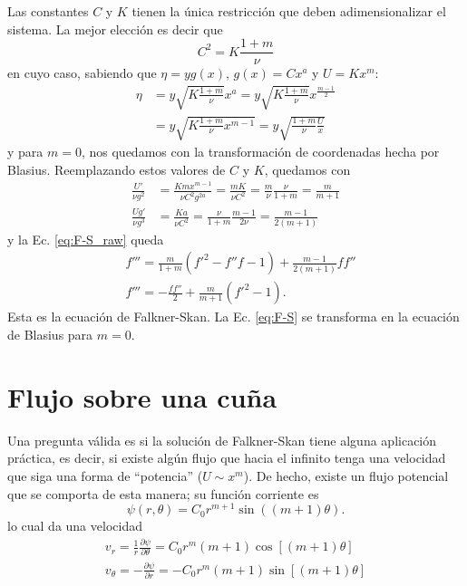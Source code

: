 Las constantes $C$ y $K$ tienen la única restricción que deben adimensionalizar el sistema.
La mejor elección es decir que 
%
\begin{equation}
C^2 = K\frac{1+m}{\nu}
\end{equation}
%
en cuyo caso, sabiendo que $\eta=yg(x)$, $g(x)=Cx^a$ y $U=Kx^m$:
%
\begin{align}\label{eq:eta_F-S}
\eta &= y\sqrt{K\frac{1+m}{\nu}}x^a = y\sqrt{K\frac{1+m}{\nu}}x^{\frac{m-1}{2}} \nonumber\\
&= y\sqrt{K\frac{1+m}{\nu}x^{m-1}} = y\sqrt{\frac{1+m}{\nu}\frac{U}{x}}
\end{align}
%
y para $m=0$, nos quedamos con la transformación de coordenadas hecha por Blasius.
Reemplazando estos valores de $C$ y $K$, quedamos con
%
\begin{align}
\frac{U'}{\nu g^2} &= \frac{Kmx^{m-1}}{\nu C^2g^{2a}} = \frac{mK}{\nu C^2} = \frac{m}{\nu}\frac{\nu}{1+m} = \frac{m}{m+1}\nonumber\\
\frac{Ug'}{\nu g^3} &= \frac{Ka}{\nu C^2} = \frac{\nu}{1+m}\frac{m-1}{2\nu} = \frac{m-1}{2(m+1)}
\end{align}
%
y la Ec. \eqref{eq:F-S_raw} queda
%
\begin{align}\label{eq:F-S}
&f''' = \frac{m}{1+m}(f'^2-f''f-1)+\frac{m-1}{2(m+1)}ff''\nonumber\\
&f''' = -\frac{ff''}{2} + \frac{m}{m+1}(f'^2-1).
\end{align}
%
Esta es la ecuación de Falkner-Skan.
La Ec. \eqref{eq:F-S} se transforma en la ecuación de Blasius para $m=0$. 

\section*{Flujo sobre una cuña}
Una pregunta válida es si la solución de Falkner-Skan tiene alguna aplicación práctica, es decir, si existe algún flujo que hacia el infinito tenga una velocidad que siga una forma de ``potencia'' ($U\sim x^m$).
De hecho, existe un flujo potencial que se comporta de esta manera; su función corriente es
%
\begin{equation}
\psi(r,\theta) = C_0 r^{m+1}\sin((m+1)\theta).
\end{equation}
%
lo cual da una velocidad
%
\begin{align}
v_r = \frac{1}{r}\frac{\partial\psi}{\partial\theta} = C_0 r^m(m+1)\cos[(m+1)\theta] \nonumber\\
v_\theta = -\frac{\partial\psi}{\partial r} = -C_0 r^m(m+1)\sin[(m+1)\theta]
\end{align}

